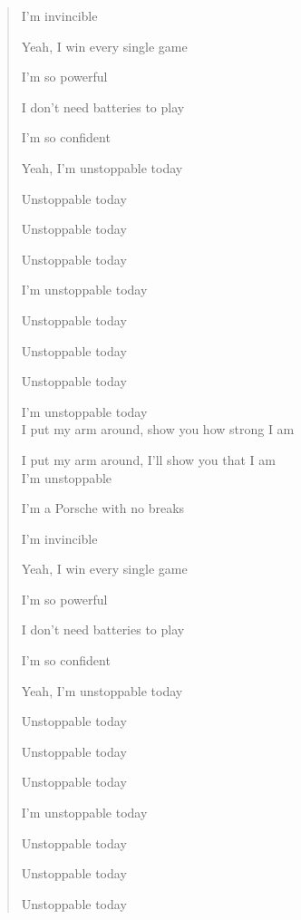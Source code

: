 \documentclass{article}
\begin{document}
\begin{enumerate}
\begin{quotation}
		I'm invincible

		Yeah, I win every single game

		I'm so powerful

		I don't need batteries to play

		I'm so confident

		Yeah, I'm unstoppable today

		Unstoppable today

		Unstoppable today

		Unstoppable today

		I'm unstoppable today

		Unstoppable today

		Unstoppable today

		Unstoppable today

		I'm unstoppable today
		\\

		I put my arm around, show you how strong I am

		I put my arm around, I'll show you that I am
		\\

		I'm unstoppable

		I'm a Porsche with no breaks

		I'm invincible

		Yeah, I win every single game

		I'm so powerful

		I don't need batteries to play

		I'm so confident

		Yeah, I'm unstoppable today

		Unstoppable today

		Unstoppable today

		Unstoppable today

		I'm unstoppable today

		Unstoppable today

		Unstoppable today

		Unstoppable today


\end{quotation}
\end{enumerate}
\end{document}
